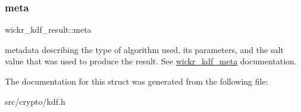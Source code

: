 \subsubsection{\texorpdfstring{meta}{meta}}
{\footnotesize\ttfamily wickr\+\_\+kdf\+\_\+result\+::meta}

metadata describing the type of algorithm used, it\textquotesingle{}s parameters, and the salt value that was used to produce the result. See \textquotesingle{}\hyperlink{structwickr__kdf__meta}{wickr\+\_\+kdf\+\_\+meta}\textquotesingle{} documentation. 

The documentation for this struct was generated from the following file\+:\begin{DoxyCompactItemize}
\item 
src/crypto/kdf.\+h\end{DoxyCompactItemize}
